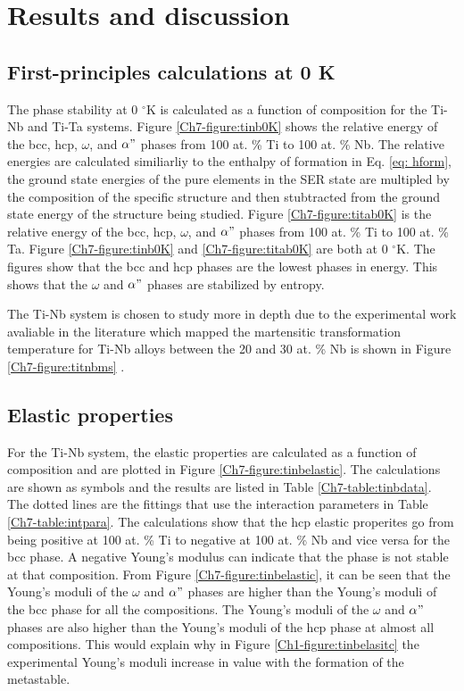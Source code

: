 \section{Results and discussion}

\subsection{First-principles calculations at 0 K}

The phase stability at 0 $^\circ$K is calculated as a function of composition for the Ti-Nb and Ti-Ta systems. Figure \ref{Ch7-figure:tinb0K} shows the relative energy of the bcc, hcp, $\omega$, and $\alpha"$ phases from 100 at. \% Ti to 100 at. \% Nb. The relative energies are calculated similiarliy to the enthalpy of formation in Eq. \ref{eq: hform}, the ground state energies of the pure elements in the SER state are multipled by the composition of the specific structure and then stubtracted from the ground state energy of the structure being studied. Figure \ref{Ch7-figure:titab0K} is the relative energy of the bcc, hcp, $\omega$, and $\alpha"$ phases from 100 at. \% Ti to 100 at. \% Ta. Figure \ref{Ch7-figure:tinb0K} and \ref{Ch7-figure:titab0K} are both at 0 $^\circ$K. The figures show that the bcc and hcp phases are the lowest phases in energy. This shows that the $\omega$ and $\alpha"$ phases are stabilized by entropy.

The Ti-Nb system is chosen to study more in depth due to the experimental work avaliable in the literature which mapped the martensitic transformation temperature for Ti-Nb alloys between the 20 and 30 at. \% Nb is shown in Figure \ref{Ch7-figure:titnbms} \cite{Kim2006}.  

\subsection{Elastic properties}

For the Ti-Nb system, the elastic properties are calculated as a function of composition and are plotted in Figure \ref{Ch7-figure:tinbelastic}. The calculations are shown as symbols and the results are listed in Table \ref{Ch7-table:tinbdata}. The dotted lines are the fittings that use the interaction parameters in Table \ref{Ch7-table:intpara}. The calculations show that the hcp elastic properites go from being positive at 100 at. \% Ti to negative at 100 at. \% Nb and vice versa for the bcc phase. A negative Young's modulus can indicate that the phase is not stable at that composition. From Figure \ref{Ch7-figure:tinbelastic}, it can be seen that the Young's moduli of the $\omega$ and $\alpha"$ phases are higher than the Young's moduli of the bcc phase for all the compositions. The Young's moduli of the $\omega$ and $\alpha"$ phases are also higher than the Young's moduli of the hcp phase at almost all compositions. This would explain why in Figure \ref{Ch1-figure:tinbelasitc} the experimental Young's moduli increase in value with the formation of the metastable. 

